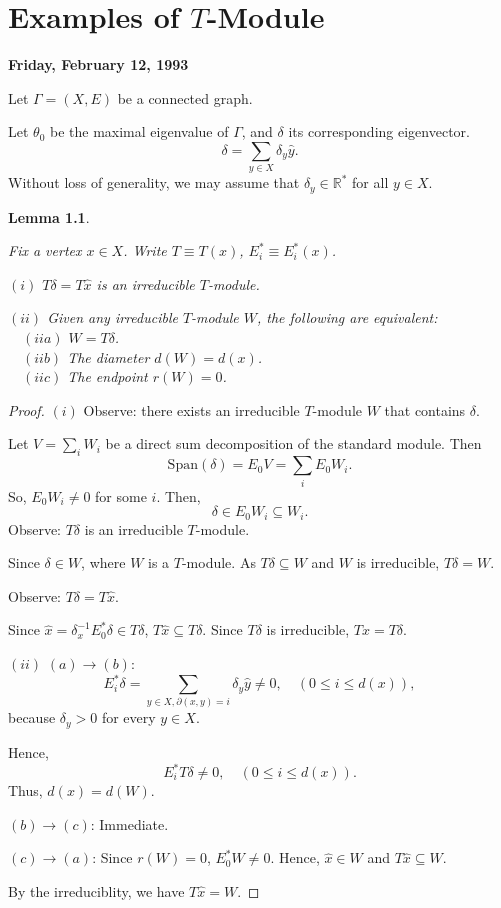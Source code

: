 \documentclass[
]{book}
\newtheorem{lemma}{Lemma}[chapter]
\theoremstyle{definition}
\theoremstyle{definition}
\theoremstyle{definition}
\theoremstyle{definition}
\theoremstyle{remark}
\begin{document}
\hypertarget{lec11}{%
\chapter{\texorpdfstring{Examples of \(T\)-Module}{Examples of T-Module}}\label{lec11}}

\textbf{Friday, February 12, 1993}

Let \(\Gamma = (X, E)\) be a connected graph.

Let \(\theta_0\) be the maximal eigenvalue of \(\Gamma\), and \(\delta\) its corresponding eigenvector.
\[\delta = \sum_{y\in X}\delta_y \hat{y}.\]
Without loss of generality, we may assume that \(\delta_y\in \mathbb{R}^*\) for all \(y\in X\).

\begin{lemma}
\protect\hypertarget{lem:principal-module}{}\label{lem:principal-module}

Fix a vertex \(x\in X\). Write \(T \equiv T(x)\), \(E^*_i\equiv E^*_i(x)\).

\((i)\) \(T\delta = T\hat{x}\) is an irreducible \(T\)-module.

\((ii)\) Given any irreducible \(T\)-module \(W\), the following are equivalent:\\
\(\quad (iia)\) \(W = T\delta\).\\
\(\quad (iib)\) The diameter \(d(W) = d(x)\).\\
\(\quad (iic)\) The endpoint \(r(W) = 0\).

\end{lemma}

\begin{proof}
\((i)\) Observe: there exists an irreducible \(T\)-module \(W\) that contains \(\delta\).

Let \(V = \sum_{i}W_i\) be a direct sum decomposition of the standard module. Then
\[\mathrm{Span}(\delta) = E_0V = \sum_{i}E_0W_i.\]
So, \(E_0W_i \neq 0\) for some \(i\). Then,
\[\delta \in E_0W_i \subseteq W_i.\]
Observe: \(T\delta\) is an irreducible \(T\)-module.

Since \(\delta\in W\), where \(W\) is a \(T\)-module. As \(T\delta \subseteq W\) and \(W\) is irreducible, \(T\delta = W\).

Observe: \(T\delta = T\hat{x}\).

Since \(\hat{x} = \delta_x^{-1}E^*_0\delta \in T\delta\), \(T\hat{x} \subseteq T\delta\). Since \(T\delta\) is irreducible, \(T\hat{x} = T\delta\).

\((ii)\) \((a)\to (b)\):
\[E^*_i\delta = \sum_{y\in X, \partial(x,y) = i}\delta_y\hat{y} \neq 0, \quad (0\leq i\leq d(x)), \]
because \(\delta_y >0\) for every \(y\in X\).

Hence,
\[E^*_iT\delta \neq 0, \quad (0\leq i\leq d(x)).\]
Thus, \(d(x) = d(W)\).

\((b)\to (c)\): Immediate.

\((c)\to (a)\):
Since \(r(W) = 0\), \(E^*_0W \neq 0\).
Hence, \(\hat{x}\in W\) and \(T\hat{x} \subseteq W\).

By the irreduciblity, we have \(T\hat{x} = W\).
\end{proof}
\end{document}
